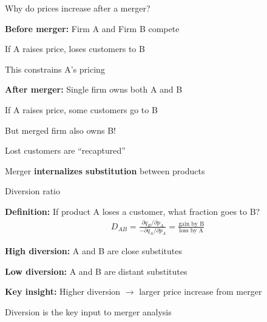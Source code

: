 \documentclass[notes,11pt, aspectratio=169]{beamer}
\newenvironment{wideitemize}{\itemize\addtolength{\itemsep}{10pt}}{\enditemize}
\begin{document}
\begin{frame}{Why do prices increase after a merger?}
	\begin{wideitemize}
		\item \textbf{Before merger:} Firm A and Firm B compete
		\begin{wideitemize}
			\vspace{5pt}
			\item If A raises price, loses customers to B
			\item This constrains A's pricing
		\end{wideitemize}
		\item \textbf{After merger:} Single firm owns both A and B
		\begin{wideitemize}
			\vspace{5pt}
			\item If A raises price, some customers go to B
			\item But merged firm also owns B!
			\item Lost customers are ``recaptured''
		\end{wideitemize}
		\item Merger \textbf{internalizes substitution} between products
	\end{wideitemize}
\end{frame}

\begin{frame}{Diversion ratio}
	\begin{wideitemize}
		\item \textbf{Definition:} If product A loses a customer, what fraction goes to B?
		\begin{align*}
			D_{AB} = \frac{\partial q_B / \partial p_A}{-\partial q_A / \partial p_A} = \frac{\text{gain by B}}{\text{loss by A}}
		\end{align*}
		\item \textbf{High diversion:} A and B are close substitutes
		\item \textbf{Low diversion:} A and B are distant substitutes
		\item \textbf{Key insight:} Higher diversion $\rightarrow$ larger price increase from merger
		\item Diversion is the key input to merger analysis
	\end{wideitemize}
\end{frame}
\end{document}
